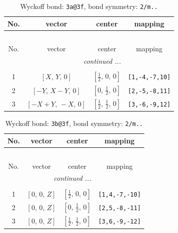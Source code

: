 \documentclass[fleqn,8pt]{jsarticle}
\begin{document}
\begin{longtable}{cccc}
\caption{Wyckoff bond: {\tt 3a@3f}, bond symmetry: {\tt 2/m..}}
 \\
 \hline \hline
No. & vector & center & mapping \\ \hline \endfirsthead

\multicolumn{3}{l}{\tablename\ \thetable{}} \\
 \hline \hline
No. & vector & center & mapping \\ \hline \endhead

 \hline \hline
\multicolumn{3}{r}{\footnotesize\it continued ...} \\ \endfoot

 \hline \hline
\multicolumn{3}{r}{} \\ \endlastfoot

1 & $\left[ X,\, Y,\, 0 \right]$ & $\left[ \frac{1}{2},\, 0,\, 0 \right]$ & {\tt [1,-4,-7,10]} \\ \hline
2 & $\left[ - Y,\, X - Y,\, 0 \right]$ & $\left[ 0,\, \frac{1}{2},\, 0 \right]$ & {\tt [2,-5,-8,11]} \\ \hline
3 & $\left[ - X + Y,\, - X,\, 0 \right]$ & $\left[ \frac{1}{2},\, \frac{1}{2},\, 0 \right]$ & {\tt [3,-6,-9,12]} \\
\end{longtable}
\renewcommand{\arraystretch}{1.2}
\begin{longtable}{cccc}
\caption{Wyckoff bond: {\tt 3b@3f}, bond symmetry: {\tt 2/m..}}
 \\
 \hline \hline
No. & vector & center & mapping \\ \hline \endfirsthead

\multicolumn{3}{l}{\tablename\ \thetable{}} \\
 \hline \hline
No. & vector & center & mapping \\ \hline \endhead

 \hline \hline
\multicolumn{3}{r}{\footnotesize\it continued ...} \\ \endfoot

 \hline \hline
\multicolumn{3}{r}{} \\ \endlastfoot

1 & $\left[ 0,\, 0,\, Z \right]$ & $\left[ \frac{1}{2},\, 0,\, 0 \right]$ & {\tt [1,4,-7,-10]} \\ \hline
2 & $\left[ 0,\, 0,\, Z \right]$ & $\left[ 0,\, \frac{1}{2},\, 0 \right]$ & {\tt [2,5,-8,-11]} \\ \hline
3 & $\left[ 0,\, 0,\, Z \right]$ & $\left[ \frac{1}{2},\, \frac{1}{2},\, 0 \right]$ & {\tt [3,6,-9,-12]} \\
\end{longtable}
\end{document}
